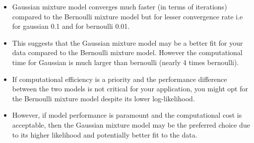 \documentclass[12pt, a4paper]{article}
\begin{document}
\begin{itemize}
    \item \large Gaussian mixture model converges much faster (in terms of iterations) compared to the Bernoulli mixture model but for lesser convergence rate i.e for gaussian 0.1 and for bernoulli 0.01.
    \item \large This suggests that the Gaussian mixture model may be a better fit for your data compared to the Bernoulli mixture model. However the computational time for Gaussian is much larger than bernoulli (nearly 4 times bernoulli).
    \item \large If computational efficiency is a priority and the performance difference between the two models is not critical for your application, you might opt for the Bernoulli mixture model despite its lower log-likelihood.
    \item \large However, if model performance is paramount and the computational cost is acceptable, then the Gaussian mixture model may be the preferred choice due to its higher likelihood and potentially better fit to the data. 
\end{itemize}
\end{document}
